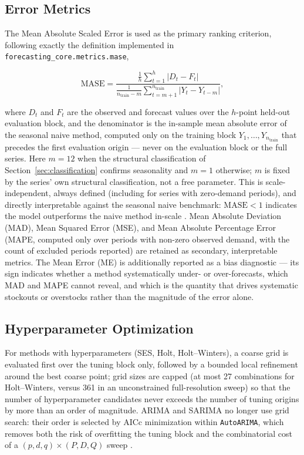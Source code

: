 \documentclass[forecasting,article,submit,pdftex,moreauthors]{Definitions/mdpi}
\begin{document}
\subsection{Error Metrics}
\label{sec:metrics}

The Mean Absolute Scaled Error is used as the primary ranking criterion, following exactly the definition implemented in \texttt{forecasting\_\allowbreak core.metrics.mase},
\begin{linenomath}
\begin{equation}
\mathrm{MASE} = \frac{\frac{1}{h}\sum_{t=1}^{h}|D_t - F_t|}{\frac{1}{n_{\text{train}}-m}\sum_{t=m+1}^{n_{\text{train}}}|Y_t - Y_{t-m}|},
\end{equation}
\end{linenomath}
where $D_t$ and $F_t$ are the observed and forecast values over the $h$-point held-out evaluation block, and the denominator is the in-sample mean absolute error of the seasonal naive method, computed only on the training block $Y_1,\dots,Y_{n_{\text{train}}}$ that precedes the first evaluation origin --- never on the evaluation block or the full series. Here $m=12$ when the structural classification of Section~\ref{sec:classification} confirms seasonality and $m=1$ otherwise; $m$ is fixed by the series' own structural classification, not a free parameter. This is scale-independent, always defined (including for series with zero-demand periods), and directly interpretable against the seasonal naive benchmark: $\mathrm{MASE}<1$ indicates the model outperforms the naive method in-scale \cite{hyndmankoehler2006}. Mean Absolute Deviation (MAD), Mean Squared Error (MSE), and Mean Absolute Percentage Error (MAPE, computed only over periods with non-zero observed demand, with the count of excluded periods reported) are retained as secondary, interpretable metrics. The Mean Error (ME) is additionally reported as a bias diagnostic --- its sign indicates whether a method systematically under- or over-forecasts, which MAD and MAPE cannot reveal, and which is the quantity that drives systematic stockouts or overstocks rather than the magnitude of the error alone.

\subsection{Hyperparameter Optimization}
\label{sec:hyperopt}

For methods with hyperparameters (SES, Holt, Holt--Winters), a coarse grid is evaluated first over the tuning block only, followed by a bounded local refinement around the best coarse point; grid sizes are capped (at most 27 combinations for Holt--Winters, versus 361 in an unconstrained full-resolution sweep) so that the number of hyperparameter candidates never exceeds the number of tuning origins by more than an order of magnitude. ARIMA and SARIMA no longer use grid search: their order is selected by AICc minimization within \texttt{AutoARIMA}, which removes both the risk of overfitting the tuning block and the combinatorial cost of a $(p,d,q)\times(P,D,Q)$ sweep \cite{hyndmankhandakar2008}.
\end{document}
